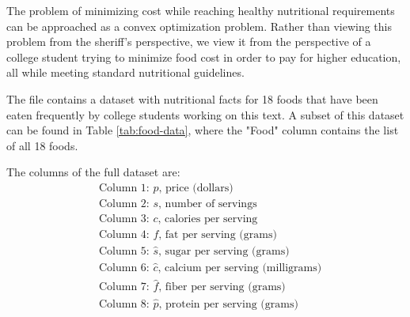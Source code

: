 The problem of minimizing cost while reaching healthy nutritional requirements can be approached as a convex optimization problem.
Rather than viewing this problem from the sheriff's perspective, we view it from the perspective of a college student trying to minimize food cost in order to pay for higher education, all while meeting standard nutritional guidelines.

The file  contains a dataset with nutritional facts for 18 foods that have been eaten frequently by college students working on this text.
A subset of this dataset can be found in Table \ref{tab:food-data}, where the "Food" column contains the list of all 18 foods.

The columns of the full dataset are:
\begin{align*}
& \text{Column 1: $p$, price (dollars)} \\
& \text{Column 2: $s$, number of servings} \\
& \text{Column 3: $c$, calories per serving} \\
& \text{Column 4: $f$, fat per serving (grams)} \\
& \text{Column 5: $\hat{s}$, sugar per serving (grams)} \\
& \text{Column 6: $\hat{c}$, calcium per serving (milligrams)} \\
& \text{Column 7: $\hat{f}$, fiber per serving (grams)} \\
& \text{Column 8: $\hat{p}$, protein per serving (grams)}
\end{align*}


